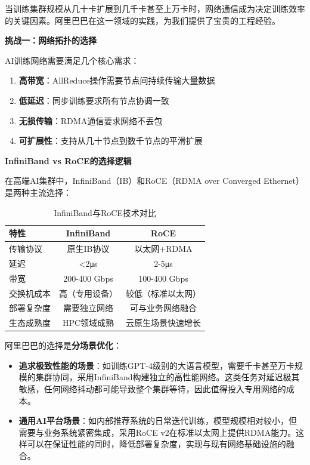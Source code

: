 当训练集群规模从几十卡扩展到几千卡甚至上万卡时，网络通信成为决定训练效率的关键因素。阿里巴巴在这一领域的实践，为我们提供了宝贵的工程经验。

\textbf{挑战一：网络拓扑的选择}

AI训练网络需要满足几个核心需求：
\begin{enumerate}
    \item \textbf{高带宽}：AllReduce操作需要节点间持续传输大量数据
    \item \textbf{低延迟}：同步训练要求所有节点协调一致
    \item \textbf{无损传输}：RDMA通信要求网络不丢包
    \item \textbf{可扩展性}：支持从几十节点到数千节点的平滑扩展
\end{enumerate}

\textbf{InfiniBand vs RoCE的选择逻辑}

在高端AI集群中，InfiniBand（IB）和RoCE（RDMA over Converged Ethernet）是两种主流选择：

\begin{table}[htbp]
\centering
\caption{InfiniBand与RoCE技术对比}
\begin{tabular}{lcc}
\toprule
\textbf{特性} & \textbf{InfiniBand} & \textbf{RoCE} \\
\midrule
传输协议 & 原生IB协议 & 以太网+RDMA \\
延迟 & <2μs & 2-5μs \\
带宽 & 200-400 Gbps & 100-400 Gbps \\
交换机成本 & 高（专用设备） & 较低（标准以太网） \\
部署复杂度 & 需要独立网络 & 可与业务网络融合 \\
生态成熟度 & HPC领域成熟 & 云原生场景快速增长 \\
\bottomrule
\end{tabular}
\end{table}

阿里巴巴的选择是\textbf{分场景优化}：

\begin{itemize}
    \item \textbf{追求极致性能的场景}：如训练GPT-4级别的大语言模型，需要千卡甚至万卡规模的集群协同，采用InfiniBand构建独立的高性能网络。这类任务对延迟极其敏感，任何网络抖动都可能导致整个集群等待，因此值得投入专用网络的成本。
    
    \item \textbf{通用AI平台场景}：如内部推荐系统的日常迭代训练，模型规模相对较小，但需要与业务系统紧密集成，采用RoCE v2在标准以太网上提供RDMA能力。这样可以在保证性能的同时，降低部署复杂度，实现与现有网络基础设施的融合。
\end{itemize}

